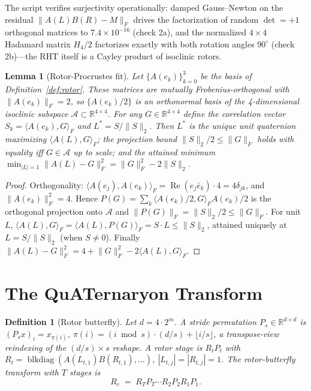 \documentclass{article}
\newtheorem{lemma}{Lemma}
\newtheorem{definition}{Definition}
\newcommand{\R}{\mathbb{R}}
\newcommand{\norm}[1]{\lVert #1 \rVert}
\newcommand{\inner}[2]{\langle #1, #2 \rangle}
\begin{document}
The script verifies surjectivity operationally: damped Gauss--Newton on the
residual $\|A(L)B(R)-M\|_F$ drives the factorization of random
$\det=+1$ orthogonal matrices to $7.4\times10^{-16}$ (check 2a), and the
normalized $4\times4$ Hadamard matrix $H_4/2$ factorizes exactly with both
rotation angles $90^\circ$ (check 2b)---the RHT itself is a Cayley product of
isoclinic rotors.

\begin{lemma}[Rotor-Procrustes fit]
\label{lem:proc}
Let $\{A(e_k)\}_{k=0}^3$ be the basis of Definition~\ref{def:rotor}. These
matrices are mutually Frobenius-orthogonal with $\|A(e_k)\|_F=2$, so
$\{A(e_k)/2\}$ is an orthonormal basis of the 4-dimensional isoclinic subspace
$\mathcal{A}\subset\R^{4\times4}$. For any $G\in\R^{4\times4}$ define the
correlation vector $S_k=\inner{A(e_k)}{G}_F$ and
$L^{*}=S/\norm{S}_2$. Then $L^{*}$ is the unique unit quaternion maximizing
$\inner{A(L)}{G}_F$; the projection bound $\norm{S}_2/2\le\norm{G}_F$ holds
with equality iff $G\in\mathcal{A}$ up to scale; and the attained minimum
$\min_{|L|=1}\norm{A(L)-G}_F^2=\norm{G}_F^2-2\norm{S}_2$.
\end{lemma}

\begin{proof}
Orthogonality: $\inner{A(e_j)}{A(e_k)}_F=\operatorname{Re}(e_j\bar e_k)\cdot4=4\delta_{jk}$,
and $\|A(e_k)\|_F^2=4$. Hence $P(G)=\sum_k\inner{A(e_k)/2}{G}_F A(e_k)/2$ is the
orthogonal projection onto $\mathcal{A}$ and
$\norm{P(G)}_F=\norm{S}_2/2\le\norm{G}_F$. For unit $L$,
$\inner{A(L)}{G}_F=\inner{A(L)}{P(G)}_F=S\cdot L\le\norm{S}_2$, attained
uniquely at $L=S/\norm{S}_2$ (when $S\neq0$). Finally
$\norm{A(L)-G}_F^2=4+\norm{G}_F^2-2\inner{A(L)}{G}_F$.
\end{proof}

\section{The QuATernaryon Transform}
\label{sec:method}

\begin{definition}[Rotor butterfly]
\label{def:butterfly}
Let $d=4\cdot2^{m}$. A \emph{stride permutation} $P_s\in\R^{d\times d}$ is
$(P_sx)_i=x_{\pi(i)}$, $\pi(i)=(i\bmod s)\cdot(d/s)+\lfloor i/s\rfloor$, a
transpose-view reindexing of the $(d/s)\times s$ reshape. A \emph{rotor stage}
is $R_tP_t$ with $R_t=\operatorname{blkdiag}(A(L_{t,1})B(R_{t,1}),\dots)$,
$|L_{t,j}|=|R_{t,j}|=1$. The \emph{rotor-butterfly transform} with $T$ stages
is
\[
R_c \;=\; R_TP_T\cdots R_2P_2R_1P_1 .
\]
\end{definition}
\end{document}

